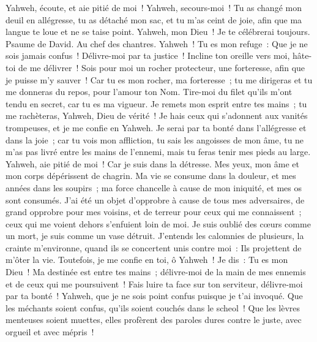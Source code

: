 \begin{multicols}{2}
Yahweh, écoute, et aie pitié de moi~! Yahweh, secours-moi~!
Tu as changé mon deuil en allégresse, tu as détaché mon sac, et tu m'as ceint de joie,
afin que ma langue te loue et ne se taise point. Yahweh, mon Dieu~! Je te célébrerai toujours.
\VerseOne{}Psaume de David. Au chef des chantres.
Yahweh~! Tu es mon refuge~: Que je ne sois jamais confus~! Délivre-moi par ta justice~!
Incline ton oreille vers moi, hâte-toi de me délivrer~! Sois pour moi un rocher protecteur, une forteresse, afin que je puisse m'y sauver~!
Car tu es mon rocher, ma forteresse~; tu me dirigeras et tu me donneras du repos, pour l'amour ton Nom.
Tire-moi du filet qu'ils m'ont tendu en secret, car tu es ma vigueur.
Je remets mon esprit entre tes mains~; tu me rachèteras, Yahweh, Dieu de vérité~!
Je hais ceux qui s'adonnent aux vanités trompeuses, et je me confie en Yahweh.
Je serai par ta bonté dans l'allégresse et dans la joie~; car tu vois mon affliction, tu sais les angoisses de mon âme,
tu ne m'as pas livré entre les mains de l'ennemi, mais tu feras tenir mes pieds au large.
Yahweh, aie pitié de moi~! Car je suis dans la détresse. Mes yeux, mon âme et mon corps dépérissent de chagrin.
Ma vie se consume dans la douleur, et mes années dans les soupirs~; ma force chancelle à cause de mon iniquité, et mes os sont consumés.
J'ai été un objet d'opprobre à cause de tous mes adversaires, de grand opprobre pour mes voisins, et de terreur pour ceux qui me connaissent~; ceux qui me voient dehors s'enfuient loin de moi.
Je suis oublié des cœurs comme un mort, je suis comme un vase détruit.
J'entends les calomnies de plusieurs, la crainte m'environne, quand ils se concertent unis contre moi~: Ils projettent de m'ôter la vie.
Toutefois, je me confie en toi, ô Yahweh~! Je dis~: Tu es mon Dieu~!
Ma destinée est entre tes mains~; délivre-moi de la main de mes ennemis et de ceux qui me poursuivent~!
Fais luire ta face sur ton serviteur, délivre-moi par ta bonté~!
Yahweh, que je ne sois point confus puisque je t'ai invoqué. Que les méchants soient confus, qu'ils soient couchés dans le scheol~!
Que les lèvres menteuses soient muettes, elles profèrent des paroles dures contre le juste, avec orgueil et avec mépris~!

\end{multicols}
